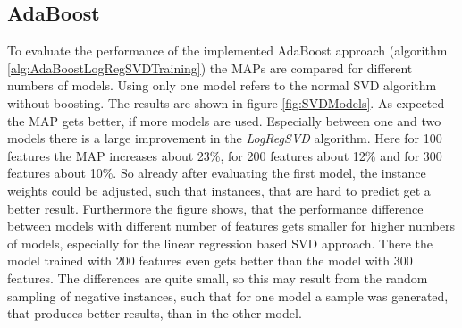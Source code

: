 \documentclass[10pt]{reportMaster}
\begin{document}
\subsection{AdaBoost}
To evaluate the performance of the implemented AdaBoost approach (algorithm \ref{alg:AdaBoostLogRegSVDTraining}) the MAPs are compared for different numbers of models.
Using only one model refers to the normal SVD algorithm without boosting.
The results are shown in figure \ref{fig:SVDModels}.
As expected the MAP gets better, if more models are used.
Especially between one and two models there is a large improvement in the \textit{LogRegSVD} algorithm.
Here for 100 features the MAP increases about 23\%, for 200 features about 12\% and for 300 features about 10\%.
So already after evaluating the first model, the instance weights could be adjusted, such that instances, that are hard to predict get a better result. 
Furthermore the figure shows, that the performance difference between models with different number of features gets smaller for higher numbers of models, especially for the linear regression based SVD approach.
There the model trained with 200 features even gets better than the model with 300 features.
The differences are quite small, so this may result from the random sampling of negative instances, such that for one model a sample was generated, that produces better results, than in the other model.
\end{document}
